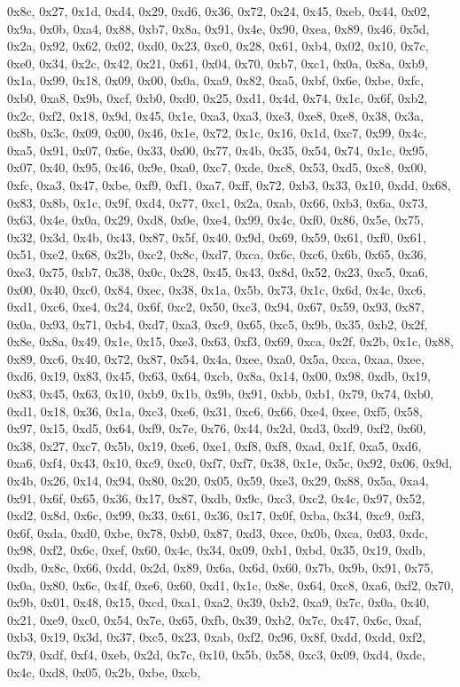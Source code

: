 \documentclass[
]{book}
\begin{document}
0x8c, 0x27, 0x1d, 0xd4, 0x29, 0xd6, 0x36, 0x72, 0x24, 0x45, 0xeb, 0x44, 0x02, 0x9a, 0x0b, 0xa4, 0x88, 0xb7, 0x8a, 0x91, 0x4e, 0x90, 0xea, 0x89, 0x46, 0x5d, 0x2a, 0x92, 0x62, 0x02, 0xd0, 0x23, 0xc0, 0x28, 0x61, 0xb4, 0x02, 0x10, 0x7c, 0xe0, 0x34, 0x2c, 0x42, 0x21, 0x61, 0x04, 0x70, 0xb7, 0xc1, 0x0a, 0x8a, 0xb9, 0x1a, 0x99, 0x18, 0x09, 0x00, 0x0a, 0xa9, 0x82, 0xa5, 0xbf, 0x6e, 0xbe, 0xfc, 0xb0, 0xa8, 0x9b, 0xcf, 0xb0, 0xd0, 0x25, 0xd1, 0x4d, 0x74, 0x1c, 0x6f, 0xb2, 0x2c, 0xf2, 0x18, 0x9d, 0x45, 0x1e,
0xa3, 0xa3, 0xe3, 0xe8, 0xe8, 0x38, 0x3a, 0x8b, 0x3c, 0x09, 0x00, 0x46, 0x1e, 0x72, 0x1c, 0x16, 0x1d, 0xc7, 0x99, 0x4c, 0xa5, 0x91, 0x07, 0x6e, 0x33, 0x00, 0x77, 0x4b, 0x35, 0x54, 0x74, 0x1c, 0x95, 0x07, 0x40, 0x95, 0x46, 0x9e, 0xa0, 0xc7, 0xde, 0xc8, 0x53, 0xd5, 0xc8, 0x00, 0xfc, 0xa3, 0x47, 0xbe, 0xf9, 0xf1, 0xa7, 0xff, 0x72, 0xb3, 0x33, 0x10, 0xdd, 0x68, 0x83, 0x8b, 0x1c, 0x9f, 0xd4, 0x77, 0xc1, 0x2a, 0xab, 0x66, 0xb3, 0x6a, 0x73, 0x63, 0x4e, 0x0a, 0x29, 0xd8, 0x0e, 0xe4, 0x99, 0x4c, 0xf0, 0x86,
0x5e, 0x75, 0x32, 0x3d, 0x4b, 0x43, 0x87, 0x5f, 0x40, 0x9d, 0x69, 0x59, 0x61, 0xf0, 0x61, 0x51, 0xe2, 0x68, 0x2b, 0xc2, 0x8c, 0xd7, 0xca, 0x6c, 0xc6, 0x6b, 0x65, 0x36, 0xe3, 0x75, 0xb7, 0x38, 0x0c, 0x28, 0x45, 0x43, 0x8d, 0x52, 0x23, 0xc5, 0xa6, 0x00, 0x40, 0xc0, 0x84, 0xec, 0x38, 0x1a, 0x5b, 0x73, 0x1c, 0x6d, 0x4c, 0xc6, 0xd1, 0xc6, 0xe4, 0x24, 0x6f, 0xc2, 0x50, 0xc3, 0x94, 0x67, 0x59, 0x93, 0x87, 0x0a, 0x93, 0x71, 0xb4, 0xd7, 0xa3, 0xc9, 0x65, 0xc5, 0x9b, 0x35, 0xb2, 0x2f, 0x8e, 0x8a, 0x49, 0x1e,
0x15, 0xe3, 0x63, 0xf3, 0x69, 0xca, 0x2f, 0x2b, 0x1c, 0x88, 0x89, 0xc6, 0x40, 0x72, 0x87, 0x54, 0x4a, 0xee, 0xa0, 0x5a, 0xca, 0xaa, 0xee, 0xd6, 0x19, 0x83, 0x45, 0x63, 0x64, 0xcb, 0x8a, 0x14, 0x00, 0x98, 0xdb, 0x19, 0x83, 0x45, 0x63, 0x10, 0xb9, 0x1b, 0x9b, 0x91, 0xbb, 0xb1, 0x79, 0x74, 0xb0, 0xd1, 0x18, 0x36, 0x1a, 0xc3, 0xe6, 0x31, 0xc6, 0x66, 0xe4, 0xee, 0xf5, 0x58, 0x97, 0x15, 0xd5, 0x64, 0xf9, 0x7e, 0x76, 0x44, 0x2d, 0xd3, 0xd9, 0xf2, 0x60, 0x38, 0x27, 0xc7, 0x5b, 0x19, 0xe6, 0xe1, 0xf8, 0xf8,
0xad, 0x1f, 0xa5, 0xd6, 0xa6, 0xf4, 0x43, 0x10, 0xc9, 0xc0, 0xf7, 0xf7, 0x38, 0x1e, 0x5c, 0x92, 0x06, 0x9d, 0x4b, 0x26, 0x14, 0x94, 0x80, 0x20, 0x05, 0x59, 0xe3, 0x29, 0x88, 0x5a, 0xa4, 0x91, 0x6f, 0x65, 0x36, 0x17, 0x87, 0xdb, 0x9c, 0xc3, 0xc2, 0x4c, 0x97, 0x52, 0xd2, 0x8d, 0x6c, 0x99, 0x33, 0x61, 0x36, 0x17, 0x0f, 0xba, 0x34, 0xc9, 0xf3, 0x6f, 0xda, 0xd0, 0xbe, 0x78, 0xb0, 0x87, 0xd3, 0xce, 0x0b, 0xca, 0x03, 0xdc, 0x98, 0xf2, 0x6c, 0xef, 0x60, 0x4c, 0x34, 0x09, 0xb1, 0xbd, 0x35, 0x19, 0xdb, 0xdb,
0x8c, 0x66, 0xdd, 0x2d, 0x89, 0x6a, 0x6d, 0x60, 0x7b, 0x9b, 0x91, 0x75, 0x0a, 0x80, 0x6c, 0x4f, 0xe6, 0x60, 0xd1, 0x1c, 0x8c, 0x64, 0xc8, 0xa6, 0xf2, 0x70, 0x9b, 0x01, 0x48, 0x15, 0xcd, 0xa1, 0xa2, 0x39, 0xb2, 0xa9, 0x7c, 0x0a, 0x40, 0x21, 0xe9, 0xc0, 0x54, 0x7e, 0x65, 0xfb, 0x39, 0xb2, 0x7c, 0x47, 0x6c, 0xaf, 0xb3, 0x19, 0x3d, 0x37, 0xc5, 0x23, 0xab, 0xf2, 0x96, 0x8f, 0xdd, 0xdd, 0xf2, 0x79, 0xdf, 0xf4, 0xeb, 0x2d, 0x7c, 0x10, 0x5b, 0x58, 0xc3, 0x09, 0xd4, 0xdc, 0x4c, 0xd8, 0x05, 0x2b, 0xbe, 0xcb,
\end{document}

